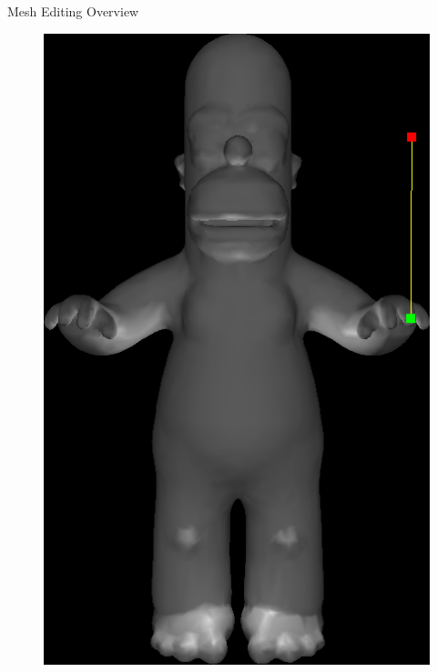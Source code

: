 \documentclass{beamer}
\begin{document}
\begin{frame}{Mesh Editing Overview}

\begin{figure}
\begin{minipage}{0.45\textwidth}
    \includegraphics[width=\textwidth]{HomerAnchor.png}
\end{minipage}
\end{figure}
\end{frame}
\end{document}

